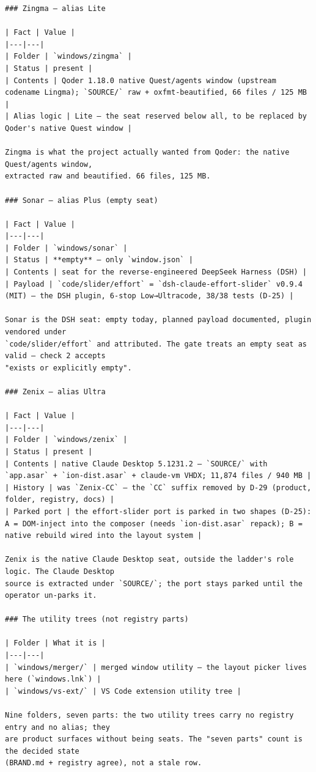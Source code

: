 \begin{Verbatim}[breaklines,breakanywhere,fontsize=\footnotesize]
### Zingma — alias Lite

| Fact | Value |
|---|---|
| Folder | `windows/zingma` |
| Status | present |
| Contents | Qoder 1.18.0 native Quest/agents window (upstream codename Lingma); `SOURCE/` raw + oxfmt-beautified, 66 files / 125 MB |
| Alias logic | Lite — the seat reserved below all, to be replaced by Qoder's native Quest window |

Zingma is what the project actually wanted from Qoder: the native Quest/agents window,
extracted raw and beautified. 66 files, 125 MB.

### Sonar — alias Plus (empty seat)

| Fact | Value |
|---|---|
| Folder | `windows/sonar` | 
| Status | **empty** — only `window.json` |
| Contents | seat for the reverse-engineered DeepSeek Harness (DSH) |
| Payload | `code/slider/effort` = `dsh-claude-effort-slider` v0.9.4 (MIT) — the DSH plugin, 6-stop Low→Ultracode, 38/38 tests (D-25) |

Sonar is the DSH seat: empty today, planned payload documented, plugin vendored under
`code/slider/effort` and attributed. The gate treats an empty seat as valid — check 2 accepts
"exists or explicitly empty".

### Zenix — alias Ultra

| Fact | Value |
|---|---|
| Folder | `windows/zenix` |
| Status | present |
| Contents | native Claude Desktop 5.1231.2 — `SOURCE/` with `app.asar` + `ion-dist.asar` + claude-vm VHDX; 11,874 files / 940 MB |
| History | was `Zenix-CC` — the `CC` suffix removed by D-29 (product, folder, registry, docs) |
| Parked port | the effort-slider port is parked in two shapes (D-25): A = DOM-inject into the composer (needs `ion-dist.asar` repack); B = native rebuild wired into the layout system |

Zenix is the native Claude Desktop seat, outside the ladder's role logic. The Claude Desktop
source is extracted under `SOURCE/`; the port stays parked until the operator un-parks it.

### The utility trees (not registry parts)

| Folder | What it is |
|---|---|
| `windows/merger/` | merged window utility — the layout picker lives here (`windows.lnk`) |
| `windows/vs-ext/` | VS Code extension utility tree |

Nine folders, seven parts: the two utility trees carry no registry entry and no alias; they
are product surfaces without being seats. The "seven parts" count is the decided state
(BRAND.md + registry agree), not a stale row.


\end{Verbatim}
